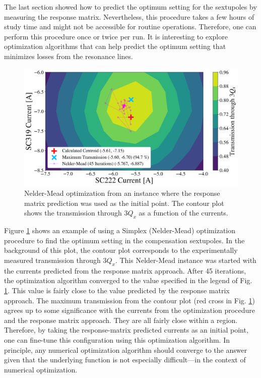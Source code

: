 The last section showed how to predict the optimum setting for the sextupoles by measuring the response matrix. Nevertheless, this procedure takes a few hours of study time and might not be accessible for routine operations. Therefore, one can perform this procedure once or twice per run. It is interesting to explore optimization algorithms that can help predict the optimum setting that minimizes losses from the resonance lines.   

\begin{figure}[H]
    \centering
    \includegraphics[width=\columnwidth]{chapter4/nelder_mead.png}
    \caption{Nelder-Mead optimization from an instance where the response matrix prediction was used as the initial point. The contour plot shows the transmission through $3Q_x$ as a function of the currents.}
    \label{fig:neldermead}
\end{figure}

Figure \ref{fig:neldermead} shows an example of using a Simplex (Nelder-Mead) optimization procedure to find the optimum setting in the compensation sextupoles. In the background of this plot, the contour plot corresponds to the experimentally measured transmission through $3Q_x$. This Nelder-Mead instance was started with the currents predicted from the response matrix approach. After 45 iterations, the optimization algorithm converged to the value specified in the legend of Fig. \ref{fig:neldermead}. This value is fairly close to the value predicted by the response matrix approach. The maximum transmission from the contour plot (red cross in Fig. \ref{fig:neldermead}) agrees up to some significance with the currents from the optimization procedure and the response matrix approach. They are all fairly close within a region. Therefore, by taking the response-matrix predicted currents as an initial point, one can fine-tune this configuration using this optimization algorithm. In principle, any numerical optimization algorithm should converge to the answer given that the underlying function is not especially difficult---in the context of numerical optimization. 

